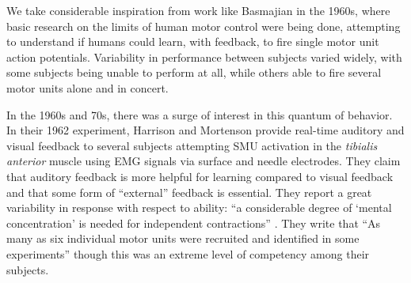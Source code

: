 \documentclass[../main.tex]{subfiles}
\begin{document}
We take considerable inspiration from work like Basmajian in the 1960s, where basic research on the limits of human motor control were being done, attempting to understand if humans could learn, with feedback, to fire single motor unit action potentials. Variability in performance between subjects varied widely, with some subjects being unable to perform at all, while others able to fire several motor units alone and in concert.

In the 1960s and 70s, there was a surge of interest in this quantum of behavior. In their 1962 experiment, Harrison and Mortenson provide real-time auditory and visual feedback to several subjects attempting SMU activation in the \textit{tibialis anterior} muscle using EMG signals via surface and needle electrodes. They claim that auditory feedback is more helpful for learning compared to visual feedback and that some form of ``external'' feedback is essential. They report a great variability in response with respect to ability: ``a considerable degree of `mental concentration' is needed for independent contractions'' \cite{Harrison1962}. They write that ``As many as six individual motor units were recruited and identified in some experiments'' though this was an extreme level of competency among their subjects.






\end{document}
